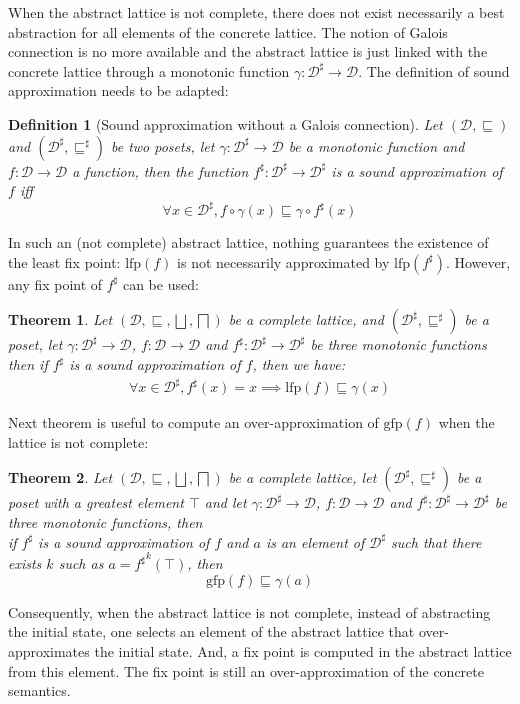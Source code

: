 \documentclass[submission,copyright,creativecommons]{eptcs}
\newtheorem{definition}{Definition}
\newtheorem{theorem}{Theorem}
\newcommand{\sh}[1]{\ensuremath{#1^\sharp}}
\newcommand{\lfp}{\ensuremath{\textrm{lfp}}}
\newcommand{\gfp}{\ensuremath{\textrm{gfp}}}
\begin{document}
When the abstract lattice is not complete, there does not exist necessarily a best
abstraction for all elements of the concrete lattice. The notion of Galois connection is
no more available and the abstract lattice is just linked with the concrete lattice
through a monotonic function $\gamma: \sh{\mathcal{D}} \rightarrow \mathcal{D}$.
The definition of sound approximation needs to be adapted:
\begin{definition} [Sound approximation without a Galois connection]
  Let $(\mathcal{D}, \sqsubseteq)$ and
  $(\mathcal{D}^\sharp, \sqsubseteq^\sharp)$ be two posets, let 
  $\gamma : \mathcal{D}^{\sharp} \rightarrow \mathcal{D}$ be a monotonic function and 
  $f : \mathcal{D} \rightarrow \mathcal{D}$ a function, then the function
  $\sh{f} : \sh{\mathcal{D}} \rightarrow \sh{\mathcal{D}}$ is a sound approximation of $f$ iff
$$
\forall x \in \mathcal{D}^{\sharp}, f \circ \gamma (x) \sqsubseteq \gamma \circ f^\sharp(x)
$$
\end{definition}
\noindent
In such an (not complete) abstract lattice, nothing guarantees the existence of the least fix point:
$\lfp(f)$ is not necessarily approximated by $\lfp(\sh{f})$. However, any fix point of $\sh{f}$ can be
used:
\begin{theorem}
  Let $(\mathcal{D}, \sqsubseteq, \bigsqcup,
  \bigsqcap)$ be a complete lattice, and $(\mathcal{D}^\sharp, \sqsubseteq^\sharp)$ be a poset, let
  $\gamma :\sh{\mathcal{D}} \rightarrow
    \mathcal{D}$, $f : \mathcal{D} \rightarrow \mathcal{D}$ and $\sh{f}
    : \sh{\mathcal{D}} \rightarrow \sh{\mathcal{D}}$ be three monotonic functions then
if $\sh{f}$ is a sound approximation of $f$, then we have:
\begin{eqnarray*}
\forall x \in \mathcal{D}^\sharp, \sh{f}(x) = x \implies \lfp(f) \sqsubseteq \gamma(x)
\end{eqnarray*}
\end{theorem}
\noindent
Next theorem is useful to compute an over-approximation of $\gfp(f)$ when the lattice is not complete:
\begin{theorem}
\label{theo:gfp_incomplet}
  Let $(\mathcal{D}, \sqsubseteq, \bigsqcup,
  \bigsqcap)$ be a complete lattice, let $(\mathcal{D}^\sharp, \sqsubseteq^\sharp)$ be a poset with
  a greatest element $\top$ and let
  $\gamma : \sh{\mathcal{D}} \rightarrow \mathcal{D}$, $f :
  \mathcal{D} \rightarrow \mathcal{D}$ and $\sh{f} : \sh{\mathcal{D}}
  \rightarrow \sh{\mathcal{D}}$ be three monotonic functions, then
  \\
  if $\sh{f}$ is a sound approximation of $f$ and $a$ is an
  element of $\sh{\mathcal{D}}$ such that there exists $k$ such as $a =
  {\sh{f}}^k(\top)$, then
$$
\gfp(f) \sqsubseteq \gamma(a)
$$
\end{theorem}
\noindent
Consequently, when the abstract lattice is not complete, instead of
abstracting the initial state, one selects
an element of the abstract lattice that over-approximates the initial state.
And, a fix point is computed in the abstract lattice from this element.
The fix point is still an over-approximation of the concrete semantics.
\end{document}
